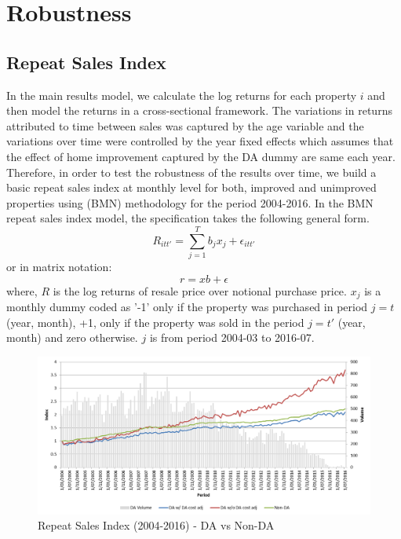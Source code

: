 \documentclass[AEJ,reqno, draftmode]{AEA} %
\begin{document}
%
%
%
%
%
%

\section{Robustness}

\subsection{Repeat Sales Index}

In the main results model, we calculate the log returns for each property $i$ and then model the returns in a cross-sectional framework. The variations in returns attributed to time between sales was captured by the age variable and the variations over time were controlled by the year fixed effects which assumes that the effect of home improvement captured by the DA dummy are same each year. Therefore, in order to test the robustness of the results over time, we build a basic repeat sales index at monthly level for both, improved and unimproved properties using \citet{bailey1963regression} (BMN) methodology for the period 2004-2016. In the BMN repeat sales index model, the specification takes the following general form.
\begin{equation}
    R_{itt'} = \sum\limits_{j=1}^{T} b_jx_j + \epsilon_{itt'}  
\end{equation}
or in matrix notation: $$r = xb + \epsilon$$
where, $R$ is the log returns of resale price over notional purchase price. $x_j$ is a monthly dummy coded as '-1' only if the property was purchased in period $j = t$ (year, month), +1, only if the property was sold in the period $j = t'$ (year, month) and zero otherwise. $j$ is from period 2004-03 to 2016-07. 
\begin{figure}[!htb]
    \centering
     \includegraphics[width=\columnwidth]{Figures/Repeat_sales_index_post_2004_notional_purchase.png}
 \caption{Repeat Sales Index (2004-2016) - DA vs Non-DA}
 \label{fig:BMN_RS_index_post_2004}
\end{figure}
\end{document}
